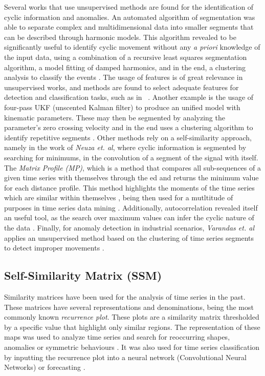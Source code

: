 Several works that use unsupervised methods are found for the identification of cyclic information and anomalies. An automated algorithm of segmentation was able to separate complex and multidimensional data into smaller segments that can be described through harmonic models. This algorithm revealed to be significantly useful to identify cyclic movement without any \textit{a priori} knowledge of the input data, using a combination of a recursive least squares segmentation algorithm, a model fitting of damped harmonics, and in the end, a clustering analysis to classify the events \cite{Lu2004,Lu2003}. The usage of features is of great relevance in unsupervised works, and methods are found to select adequate features for detection and classification tasks, such as in ~\cite{machado2015}. Another example is the usage of four-pass UKF (unscented Kalman filter) to produce an unified model with kinematic parameters. These may then be segmented by analyzing the parameter's zero crossing velocity and in the end uses a clustering algorithm to identify repetitive segments \cite{Wang2015a}. Other methods rely on a self-similarity approach, namely in the work of \textit{Neuza et. al}\cite{neuza}, where cyclic information is segmented by searching for minimums, in the convolution of a segment of the signal with itself. The \textit{Matrix Profile (MP)}, which is a method that compares all sub-sequences of a given time series with themselves through the \gls{ed} and returns the minimum value for each distance profile. This method highlights the moments of the time series which are similar within themselves \cite{Yeh2018}, being then used for a mutltitude of purposes in time series data mining \cite{mpdist, mpxxiv, mpxix, mpxvi}. Additionally, autocorrelation revealed itself an useful tool, as the search over maximum values can infer the cyclic nature of the data \cite{Bauters2014}. Finally, for anomaly detection in industrial scenarios, \textit{Varandas et. al} applies an unsupervised method based on the clustering of time series segments to detect improper movements \cite{Varandas19}. 

\subsection{Self-Similarity Matrix (SSM)}

Similarity matrices have been used for the analysis of time series in the past. These matrices have several representations and denominations, being the most commonly known \textit{recurrence plot}. These plots are a similarity matrix thresholded by a specific value that highlight only similar regions. The representation of these maps was used to analyze time series \cite{eamonn_dotplots,recurrenceplots1} and search for reoccurring shapes, anomalies or symmetric behaviours \cite{eamonn_dotplots}. It was also used for time series classification by inputting the recurrence plot into a neural network (Convolutional Neural Networks) \cite{recurrenceplots1, recurrenceplots2} or forecasting \cite{recurrenceplots3}.

